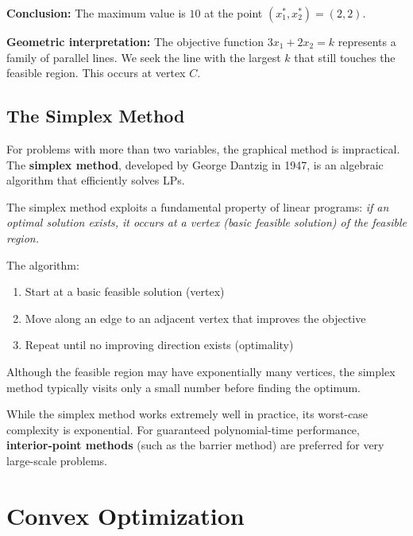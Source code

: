 \begin{examplebox}[title=Example: Linear Programming (Graphical Solution)]
\textbf{Conclusion:} The maximum value is $\boxed{10}$ at the point $(x_1^*, x_2^*) = (2, 2)$.

\textbf{Geometric interpretation:} The objective function $3x_1 + 2x_2 = k$ represents a family of parallel lines. We seek the line with the largest $k$ that still touches the feasible region. This occurs at vertex $C$.
\end{examplebox}

\subsection{The Simplex Method}

For problems with more than two variables, the graphical method is impractical. The \textbf{simplex method}, developed by George Dantzig in 1947, is an algebraic algorithm that efficiently solves LPs.

\begin{keyconceptbox}[title=Simplex Method Overview]
The simplex method exploits a fundamental property of linear programs: \textit{if an optimal solution exists, it occurs at a vertex (basic feasible solution) of the feasible region.}

The algorithm:
\begin{enumerate}
    \item Start at a basic feasible solution (vertex)
    \item Move along an edge to an adjacent vertex that improves the objective
    \item Repeat until no improving direction exists (optimality)
\end{enumerate}

Although the feasible region may have exponentially many vertices, the simplex method typically visits only a small number before finding the optimum.
\end{keyconceptbox}

\begin{warningbox}[title=Computational Complexity]
While the simplex method works extremely well in practice, its worst-case complexity is exponential. For guaranteed polynomial-time performance, \textbf{interior-point methods} (such as the barrier method) are preferred for very large-scale problems.
\end{warningbox}

\section{Convex Optimization}

